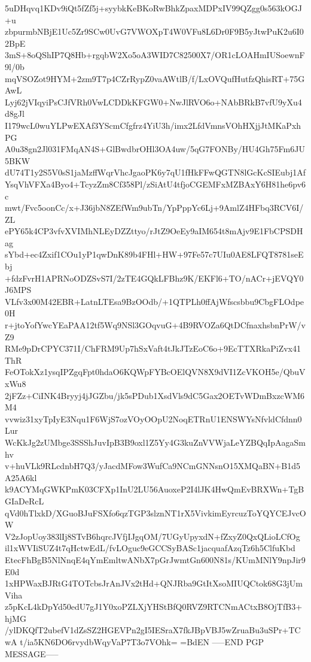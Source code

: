 5uDHqvq1KDv9iQt5fZf5j+syybkKeBKoRwBhkZpaxMDPxIV99QZgg0s563kOGJ+u
zbpurmbNBjE1Uc5Zr9SCw0UvG7VWOXpT4W0VFu8L6Dr0F9B5yJtwPuK2u6I02BpE
3mS+8oQShIP7Q8Hb+rgqbW2Xo5oA3WID7C82500X7/OR1cLOAHmIUSoewnF9l/0b
mqVSOZot9HYM+2zm9T7p4CZrRypZ0vaAWtlB/f/LxOVQufHutfzQhisRT+75GAwL
Lyj62jVIqyiPsCJfVRh0VwLCDDkKFGW0+NwJlRVO6o+NAbBRkB7vfU9yXu4d8gJl
I179wcL0wuYLPwEXAf3YScmCfgfrz4YiU3h/imx2LfdVmnsVOhHXjjJtMKaPxhPG
A0u38gn2Jl031FMqAN4S+GlBwdbrOHl3OA4uw/5qG7FONBy/HU4Gh75Fm6JU5BKW
dU74T1y2S5V0sS1jaMzffWqrVhcJgaoPK6y7qU1fHkFFwQGTN8lGcKcSIEubj1Af
YsqVhVFXa4Byo4+TcyzZm8Cf358Pl/zSiAtU4tfjoCGEMFxMZBAxY6H81he6pv6c
mwt/Fvc5oonCc/x+J36jbN8ZEfWm9ubTn/YpPppYc6Lj+9AmlZ4HFbq3RCV6I/ZL
ePY65k4CP3vfvXVIMhNLEyDZZttyo/rJtZ9OeEy9aIM654t8mAjv9E1FbCPSDHag
sYbd+ec4Zxif1COu1yP1qwDnK89b4FHl+HW+97Fe57c7UIu0AE8LFQT8781seEbj
+fdzFvrH1APRNoODZSvS7I/2zTE4GQkLFBhz9K/EKFl6+TO/nACr+jEVQY0J6MPS
VLfv3x00M42EBR+LatnLTEsa9BzOOdb/+1QTPLh0ffAjWfscsbbu9CbgFLOdpe0H
r+jtoYofYwcYEaPAA12tf5Wq9NSl3GOqvuG+4B9RVOZa6QtDCfnaxhsbnPrW/vZ9
RMe9pDrCPYC371I/ChFRM9Up7hSxVaft4tJkJTzEoC6o+9EcTTXRkaPiZvx41ThR
FeOTokXz1ysqIPZgqFpt0hdaO6KQWpFYBcOElQVN8X9dVI1ZcVKOH5e/QbuVxWu8
2jFZz+CiINK4Bryyj4jJGZbu/jk5sPDub1XsdVls9dC5Gax2OETvWDmBxzcWM6M4
vvwiz31xyTpIyE3Nqu1F6WjS7ozVOyOOpU2NoqETRnU1ENSWYsNfvldCfdnn0Lur
WcKkJg2zUMbge3SSShJuvIpB3B9oxl1Z5Yy4G3kuZnVVWjaLeYZBQqIpAagaSmhv
v+huVLk9RLcdnbH7Q3/yJacdMFow3WufCa9NCmGNNsnO15XMQaBN+B1d5A25A6kl
k9ACYMqGWKPmK03CFXp1InU2LU56AuoxeP2I4lJK4HwQmEvBRXWn+TgBGIaDeRcL
qVd0hTlxkD/XGuoBJuFSXfo6qzTGP3slznNT1rX5VivkimEyrcuzToYQYCEJvcOW
V2zJopUoy383lIj8STvB6hqrcJVfjIJgqOM/7UGyUpyxdN+fZxyZ0QxQLioLCfOg
il1xWVIiSUZ4t7qHctwEdL/fvLOguc9eGCCSyBASc1jacquafAzqTz6h5ClfuKbd
EtecFhBgB5NlNnqE4qYmEmltwANbX7pGrJwmtGn600N81s/KUmMNlY9npJir9E0d
1xHPWaxBJRtG4TOTcbsJrAnJVx2tHd+QNJRba9GtItXsoMIUQCtok68G3jUmViha
z5pKcL4kDpYd50edU7gJ1Y0xoPZLXjYHStBfQ0RVZ9RTCNmACtxB8OjTfB3+hjMG
/ylDKQfT2ubefV1dZsSZ2HGEVPn2gI5IESraX7fkJBpVBJ5wZruaBu3uSPr+TCwA
t/ia5KN6DO6rvydbWqyVaP7T3o7VOhk=
=BdEN
-----END PGP MESSAGE-----
